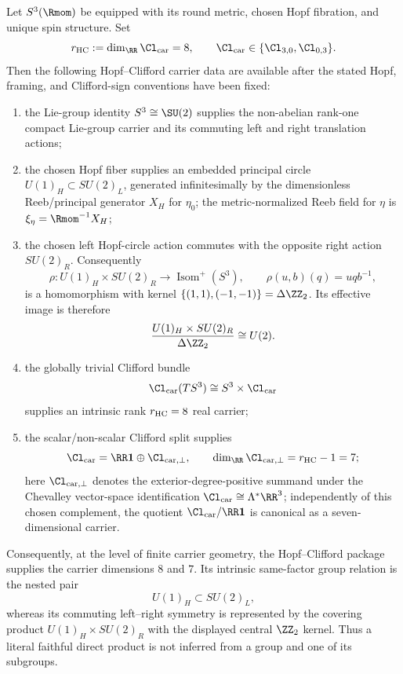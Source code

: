 \documentclass[11pt]{article}
\begin{document}
\begin{theorem}
\label{p1:thm:hopf-clifford-finite-carrier}
\leavevmode\par\noindent
Let \(S^3(\Rmom)\) be equipped with its round metric, chosen Hopf fibration,
and unique spin structure.  Set
\[
    r_{\rm HC}:=\dim_{\RR}\Cl_{\mathrm{car}}=8,
    \qquad
    \Cl_{\mathrm{car}}\in\{\Cl_{3,0},\Cl_{0,3}\}.
\]
Then the following Hopf--\allowbreak Clifford carrier data are available after
the stated Hopf, framing, and Clifford-sign conventions have been fixed:
\begin{enumerate}
    \item the Lie-group identity \(S^3\cong\SU(2)\) supplies the non-abelian
    rank-one compact Lie-group carrier and its commuting left and right
    translation actions;
    \item the chosen Hopf fiber supplies an embedded principal circle
    \(U(1)_H\subset SU(2)_L\), generated infinitesimally by the dimensionless
    Reeb/principal generator \(X_H\) for \(\eta_0\); the metric-normalized Reeb
    field for \(\eta\) is \(\xi_\eta=\Rmom^{-1}X_H\);
    \item the chosen left Hopf-circle action commutes with the opposite right
    action \(SU(2)_R\).  Consequently
    \[
       \rho:U(1)_H\times SU(2)_R\longrightarrow
       \operatorname{Isom}^+(S^3),
       \qquad
       \rho(u,b)(q)=u q b^{-1},
    \]
    is a homomorphism with kernel
    \(\{(1,1),(-1,-1)\}=\Delta\ZZ_2\).  Its effective image is therefore
    \[
       \frac{U(1)_H\times SU(2)_R}{\Delta\ZZ_2}\cong U(2).
    \]
    \item the globally trivial Clifford bundle
    \[
        \Cl_{\mathrm{car}}(TS^3)\cong S^3\times\Cl_{\mathrm{car}}
    \]
    supplies an intrinsic rank \(r_{\rm HC}=8\) real carrier;
    \item the scalar/non-scalar Clifford split supplies
    \[
        \Cl_{\mathrm{car}}=\RR\mathbf 1\oplus \Cl_{\mathrm{car},\perp},
        \qquad
        \dim_\RR\Cl_{\mathrm{car},\perp}=r_{\rm HC}-1=7;
    \]
    here \(\Cl_{\mathrm{car},\perp}\) denotes the exterior-degree-positive summand under the Chevalley vector-space identification \(\Cl_{\mathrm{car}}\cong\Lambda^*\RR^3\); independently of this chosen complement, the quotient \(\Cl_{\mathrm{car}}/\RR\mathbf1\) is canonical as a seven-dimensional carrier.
\end{enumerate}
Consequently, at the level of finite carrier geometry, the Hopf--Clifford
package supplies the carrier dimensions \(8\) and \(7\).  Its intrinsic
same-factor group relation is the nested pair
\[
    U(1)_H\subset SU(2)_L,
\]
whereas its commuting left--right symmetry is represented by the covering
product \(U(1)_H\times SU(2)_R\) with the displayed central \(\ZZ_2\) kernel.
Thus a literal faithful direct product is not inferred from a group and one of
its subgroups.
\end{theorem}
\end{document}
